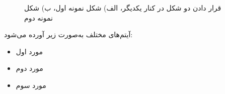 \begin{figure}[!htb]
\centering
{}
\quad
{}
\caption{
قرار دادن دو شکل در کنار یکدیگر، الف) شکل نمونه اول،
ب) شکل نمونه دوم
}
\label{Fig:SampleFigure2}
\end{figure}





آیتم‌های مختلف به‌صورت زیر آورده می‌شود:
\begin{itemize}[label=-]
\item
مورد اول
\item
مورد دوم
\item
مورد سوم
\end{itemize}

